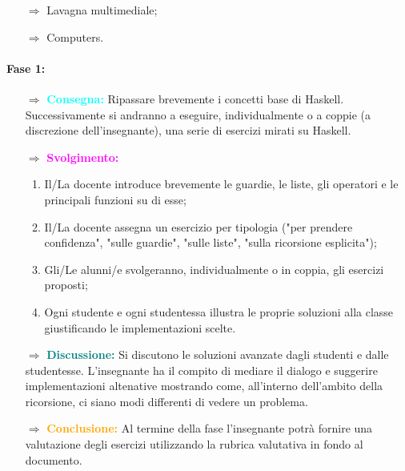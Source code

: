 \begin{itemize}
    \item [$\Rightarrow$] Lavagna multimediale;
    \item [$\Rightarrow$] Computers.
\end{itemize}


\paragraph{Fase 1:}

\begin{itemize}
    \item [$\Rightarrow$] \textbf{\textcolor{cyan}{Consegna:}} Ripassare brevemente i concetti base di Haskell. Successivamente
    si andranno a eseguire, individualmente o a coppie (a discrezione dell'insegnante), una serie di esercizi mirati su Haskell. 
    \item [$\Rightarrow$] \textbf{\textcolor{magenta}{Svolgimento:}}
    \begin{enumerate}
        \item Il/La docente introduce brevemente le guardie, le liste, gli operatori e le principali funzioni su di esse;
        \item Il/La docente assegna un esercizio per tipologia ("per prendere confidenza", "sulle guardie", "sulle liste", "sulla ricorsione esplicita");
        \item Gli/Le alunni/e svolgeranno, individualmente o in coppia, gli esercizi proposti;
        \item Ogni studente e ogni studentessa illustra le proprie soluzioni alla classe giustificando le implementazioni scelte.
    \end{enumerate}
    \item [$\Rightarrow$] \textbf{\textcolor{teal}{Discussione:}} Si discutono le soluzioni avanzate dagli studenti e dalle studentesse.
    L'insegnante ha il compito di mediare il dialogo e suggerire implementazioni altenative mostrando come, all'interno dell'ambito della ricorsione,
    ci siano modi differenti di vedere un problema.
    \item [$\Rightarrow$] \textbf{\textcolor{orange}{Conclusione:}} Al termine della fase l'insegnante 
    potrà fornire una valutazione degli esercizi utilizzando la rubrica valutativa in fondo al documento. 
\end{itemize}

